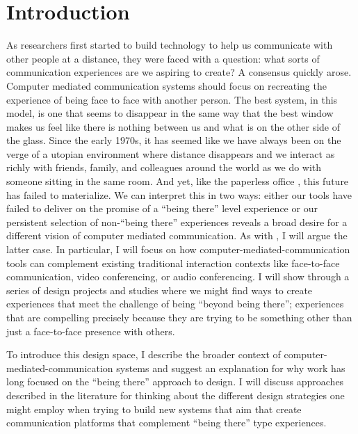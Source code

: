 \chapter{Introduction}
\label{ch:intro}


As researchers first started to build technology to help us communicate with other people at a distance, they were faced with a question: what sorts of communication experiences are we aspiring to create? A consensus quickly arose. Computer mediated communication systems should focus on recreating the experience of being face to face with another person. The best system, in this model, is one that seems to disappear in the same way that the best window makes us feel like there is nothing between us and what is on the other side of the glass. Since the early 1970s, it has seemed like we have always been on the verge of a utopian environment where distance disappears and we interact as richly with friends, family, and colleagues around the world as we do with someone sitting in the same room. \citep{Egido:1988vq} And yet, like the paperless office \citep{Sellen:2001uk}, this future has failed to materialize. We can interpret this in two ways: either our tools have failed to deliver on the promise of a ``being there'' level experience or our persistent selection of non-``being there'' experiences reveals a broad desire for a different vision of computer mediated communication. As with \citet{Hollan:1992tz}, I will argue the latter case. In particular, I will focus on how  computer-mediated-communication tools can complement existing traditional interaction contexts like face-to-face communication, video conferencing, or audio conferencing. I will show through a series of design projects and studies where we might find ways to create experiences that meet the challenge of being ``beyond being there''; experiences that are compelling precisely because they are trying to be something other than just a face-to-face presence with others.

To introduce this design space, I describe the broader context of computer-mediated-communication systems and suggest an explanation for why work has long focused on the ``being there'' approach to design. I will discuss approaches described in the literature for thinking about the different design strategies one might employ when trying to build new systems that aim that create communication platforms that complement ``being there'' type experiences.


